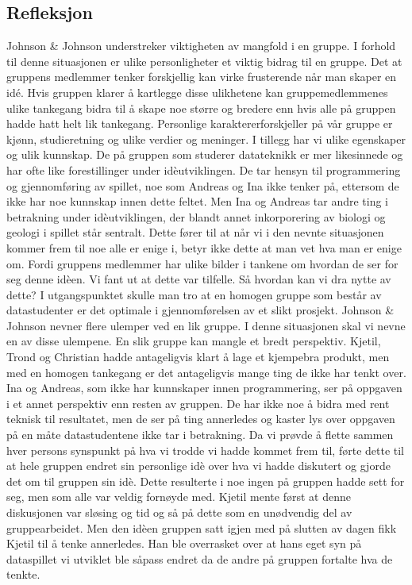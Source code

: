 \subsection{Refleksjon}
Johnson \& Johnson  \cite{Johnson} understreker viktigheten av mangfold
i en gruppe. I forhold til denne situasjonen er ulike personligheter et
viktig bidrag til en gruppe. Det at gruppens medlemmer tenker
forskjellig kan virke frusterende når man skaper en idé. Hvis gruppen
klarer å kartlegge disse ulikhetene kan gruppemedlemmenes ulike
tankegang bidra til å skape noe større og bredere enn hvis alle på
gruppen hadde hatt helt lik tankegang. Personlige karaktererforskjeller
på vår gruppe er kjønn, studieretning og ulike verdier og meninger. I
tillegg har vi ulike egenskaper og ulik kunnskap. De på gruppen som
studerer datateknikk er mer likesinnede og har ofte like forestillinger
under idèutviklingen. De tar hensyn til programmering og gjennomføring
av spillet, noe som Andreas og Ina ikke tenker på, ettersom de ikke har
noe kunnskap innen dette feltet. Men Ina og Andreas tar andre ting i
betrakning under idèutviklingen, der blandt annet inkorporering av
biologi og geologi i spillet står sentralt. Dette fører til at når vi i
den nevnte situasjonen kommer frem til noe alle er enige i, betyr ikke
dette at man vet hva man er enige om. Fordi gruppens medlemmer har ulike
bilder i tankene om hvordan de ser for seg denne idèen. Vi fant ut at
dette var tilfelle. Så hvordan kan vi dra nytte av dette?  I
utgangspunktet skulle man tro at en homogen gruppe som består av
datastudenter er det optimale i gjennomførelsen av et slikt prosjekt.
Johnson \& Johnson nevner flere ulemper ved en lik gruppe. I denne
situasjonen skal vi nevne en av disse ulempene. En slik gruppe kan
mangle et bredt perspektiv. Kjetil, Trond og Christian hadde
antageligvis klart å lage et kjempebra produkt, men med en homogen
tankegang er det antageligvis mange ting de ikke har tenkt over. Ina og
Andreas, som ikke har kunnskaper innen programmering, ser på oppgaven i
et annet perspektiv enn resten av gruppen. De har ikke noe å bidra med
rent teknisk til resultatet, men de ser på ting annerledes og kaster lys
over oppgaven på en måte datastudentene ikke tar i betrakning. Da vi
prøvde å flette sammen hver persons synspunkt på hva vi trodde vi hadde
kommet frem til, førte dette til at hele gruppen endret sin personlige
idè over hva vi hadde diskutert og gjorde det om til gruppen sin idè.
Dette resulterte i noe ingen på gruppen hadde sett for seg, men som alle
var veldig fornøyde med.  Kjetil mente først at denne diskusjonen var
sløsing og tid og så på dette som en unødvendig del av gruppearbeidet.
Men den idèen gruppen satt igjen med på slutten av dagen fikk Kjetil til
å tenke annerledes. Han ble overrasket over at hans eget syn på
dataspillet vi utviklet ble såpass endret da de andre på gruppen
fortalte hva de tenkte. 

